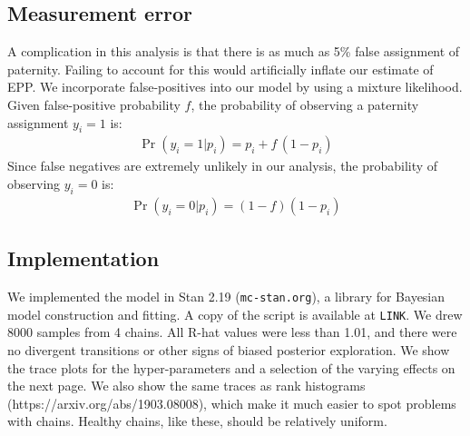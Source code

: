 \documentclass[reqno ,12pt]{amsart}
\begin{document}
\subsection*{Measurement error}

A complication in this analysis is that there is as much as 5\% false assignment of paternity. Failing to account for this would artificially inflate our estimate of EPP. We incorporate false-positives into our model by using a mixture likelihood. Given false-positive probability $f$, the probability of observing a paternity assignment $y_i=1$ is:
\begin{align*}
	\Pr( y_i=1 | p_i ) = p_i + f\, (1 - p_i)
\end{align*}
Since false negatives are extremely unlikely in our analysis, the probability of observing $y_i=0$ is:
\begin{align*}
	\Pr( y_i=0 | p_i ) = (1-f)(1 - p_i)
\end{align*}

\subsection*{Implementation}

We implemented the model in Stan 2.19 (\texttt{mc-stan.org}), a library for Bayesian model construction and fitting. A copy of the script is available at \texttt{LINK}. We drew 8000 samples from 4 chains. All R-hat values were less than 1.01, and there were no divergent transitions or other signs of biased posterior exploration. We show the trace plots for the hyper-parameters and a selection of the varying effects on the next page. We also show the same traces as rank histograms (https://arxiv.org/abs/1903.08008), which make it much easier to spot problems with chains. Healthy chains, like these, should be relatively uniform.
\end{document}
